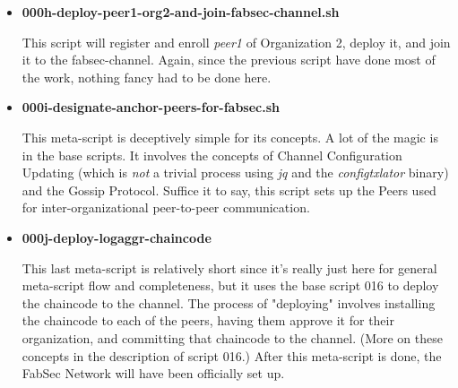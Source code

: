\begin{itemize}
				\item \textbf{000h-deploy-peer1-org2-and-join-fabsec-channel.sh}
				
					\hspace{10mm}This script will register and enroll \textit{peer1} of Organization 2, deploy it, and join it to the fabsec-channel. Again, since the previous script have done most of the work, nothing fancy had to be done here.
					
				\item \textbf{000i-designate-anchor-peers-for-fabsec.sh}
				
					\hspace{10mm}This meta-script is deceptively simple for its concepts. A lot of the magic is in the base scripts. It involves the concepts of Channel Configuration Updating (which is \textit{not} a trivial process using \textit{jq} and the \textit{configtxlator} binary) and the Gossip Protocol. Suffice it to say, this script sets up the Peers used for inter-organizational peer-to-peer communication.
					
				\item \textbf{000j-deploy-logaggr-chaincode}
				
					\hspace{10mm}This last meta-script is relatively short since it's really just here for general meta-script flow and completeness, but it uses the base script 016 to deploy the chaincode to the channel. The process of "deploying" involves installing the chaincode to each of the peers, having them approve it for their organization, and committing that chaincode to the channel. (More on these concepts in the description of script 016.) After this meta-script is done, the FabSec Network will have been officially set up.		
			\end{itemize}
			
